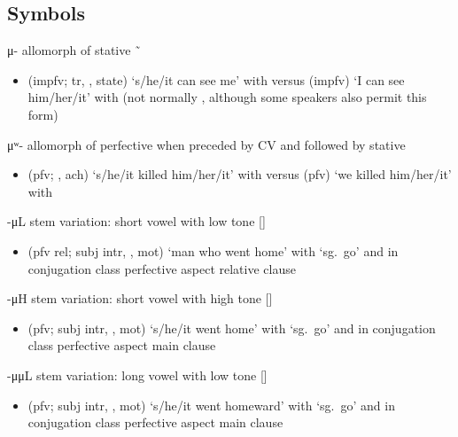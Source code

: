 \documentclass[12pt,letterpaper,oneside,article]{memoir}
\begin{document}
\subsection{Symbols}\label{sec:alphalist-sym}
\begin{morphdesc}[resume*=alphalist]
\item[μ-]
	allomorph of stative  \~\ 
	\begin{itemize}
	\item	{} (impfv; tr, ,  state) ‘s/he/it can see me’
			with \newline
		versus  (impfv) ‘I can see him/her/it’
			with \newline
		(not normally , although some speakers also permit this form)
	\end{itemize}

\item[μʷ-]
	allomorph of perfective  when preceded by CV and followed by  stative
	\begin{itemize}
	\item	{} (pfv; , ach) ‘s/he/it killed him/her/it’
			with \newline
		versus  (pfv) ‘we killed him/her/it’
			with 
	\end{itemize}

\item[-μL]
	stem variation: short vowel with low tone []
	\begin{itemize}
	\item	{} (pfv rel; subj intr, , mot) ‘man who went home’
		with  ‘sg.\ go’ and 
		in  conjugation class perfective aspect relative clause
	\end{itemize}

\item[-μH]
	stem variation: short vowel with high tone []
	\begin{itemize}
	\item	{} (pfv; subj intr, , mot) ‘s/he/it went home’
		with  ‘sg.\ go’ and 
		in  conjugation class perfective aspect main clause
	\end{itemize}

\item[-μμL]
	stem variation: long vowel with low tone []
	\begin{itemize}
	\item	{} (pfv; subj intr, , mot) ‘s/he/it went homeward’
		with  ‘sg.\ go’ and 
		in  conjugation class perfective aspect main clause
	\end{itemize}


\end{morphdesc}
\end{document}
